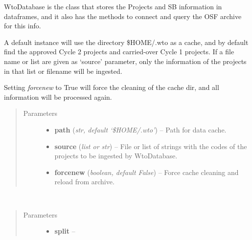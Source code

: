 \documentclass[a4paper,10pt,english]{sphinxmanual}
\begin{document}

\begin{fulllineitems}
\label{wtoapi:wtoDatabase.WtoDatabase}
WtoDatabase is the class that stores the Projects and SB information in
dataframes, and it also has the methods to connect and query the OSF
archive for this info.

A default instance will use the directory \$HOME/.wto as a cache, and by
default find the approved Cycle 2 projects and carried-over Cycle 1
projects. If a file name or list are given as `source' parameter, only the
information of the projects in that list or filename will be ingested.

Setting \emph{forcenew} to True will force the cleaning of the cache dir, and
all information will be processed again.
\begin{quote}\begin{description}
\item[{Parameters}] \leavevmode\begin{itemize}
\item {} 
\textbf{path} (\emph{str, default `\$HOME/.wto'}) -- Path for data cache.

\item {} 
\textbf{source} (\emph{list or str}) -- File or list of strings with the codes of the projects
to be ingested by WtoDatabase.

\item {} 
\textbf{forcenew} (\emph{boolean, default False}) -- Force cache cleaning and reload from archive.

\end{itemize}

\end{description}\end{quote}

\begin{fulllineitems}
\label{wtoapi:wtoDatabase.WtoDatabase.create_allsb}~\begin{quote}\begin{description}
\item[{Parameters}] \leavevmode\begin{itemize}
\item {} 
\textbf{split} -- 


\end{itemize}
\end{description}
\end{quote}
\end{fulllineitems}
\end{fulllineitems}
\end{document}
